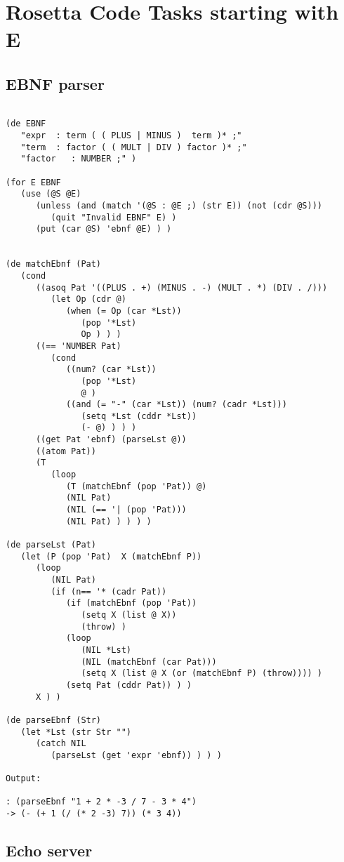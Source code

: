 \chapter{Rosetta Code Tasks starting with E}

\section*{EBNF parser}

\begin{verbatim}

(de EBNF
   "expr  : term ( ( PLUS | MINUS )  term )* ;"
   "term  : factor ( ( MULT | DIV ) factor )* ;"
   "factor   : NUMBER ;" )

(for E EBNF
   (use (@S @E)
      (unless (and (match '(@S : @E ;) (str E)) (not (cdr @S)))
         (quit "Invalid EBNF" E) )
      (put (car @S) 'ebnf @E) ) )


(de matchEbnf (Pat)
   (cond
      ((asoq Pat '((PLUS . +) (MINUS . -) (MULT . *) (DIV . /)))
         (let Op (cdr @)
            (when (= Op (car *Lst))
               (pop '*Lst)
               Op ) ) )
      ((== 'NUMBER Pat)
         (cond
            ((num? (car *Lst))
               (pop '*Lst)
               @ )
            ((and (= "-" (car *Lst)) (num? (cadr *Lst)))
               (setq *Lst (cddr *Lst))
               (- @) ) ) )
      ((get Pat 'ebnf) (parseLst @))
      ((atom Pat))
      (T
         (loop
            (T (matchEbnf (pop 'Pat)) @)
            (NIL Pat)
            (NIL (== '| (pop 'Pat)))
            (NIL Pat) ) ) ) )

(de parseLst (Pat)
   (let (P (pop 'Pat)  X (matchEbnf P))
      (loop
         (NIL Pat)
         (if (n== '* (cadr Pat))
            (if (matchEbnf (pop 'Pat))
               (setq X (list @ X))
               (throw) )
            (loop
               (NIL *Lst)
               (NIL (matchEbnf (car Pat)))
               (setq X (list @ X (or (matchEbnf P) (throw)))) )
            (setq Pat (cddr Pat)) ) )
      X ) )

(de parseEbnf (Str)
   (let *Lst (str Str "")
      (catch NIL
         (parseLst (get 'expr 'ebnf)) ) ) )

Output:

: (parseEbnf "1 + 2 * -3 / 7 - 3 * 4")
-> (- (+ 1 (/ (* 2 -3) 7)) (* 3 4))

\end{verbatim}

\section*{Echo server}

